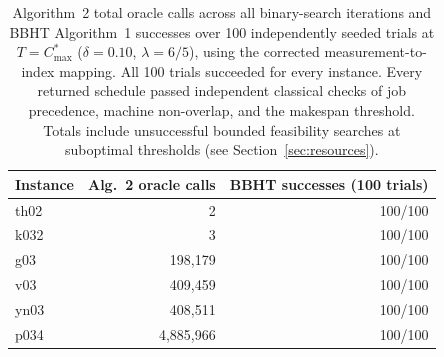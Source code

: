 \begin{table}[!ht]
\centering\small
\begin{tabular}{lrr}
\toprule
Instance & Alg.~2 oracle calls & BBHT successes (100 trials) \\
\midrule
th02 & 2 & 100/100 \\
k032 & 3 & 100/100 \\
g03  & 198{,}179 & 100/100 \\
v03  & 409{,}459 & 100/100 \\
yn03 & 408{,}511 & 100/100 \\
p034 & 4{,}885{,}966 & 100/100 \\
\bottomrule
\end{tabular}
\caption{Algorithm~2 total oracle calls across all binary-search
iterations and BBHT Algorithm~1 successes over 100 independently seeded
trials at $T=C^*_{\max}$ ($\delta=0.10$, $\lambda=6/5$),
using the corrected measurement-to-index mapping.
All 100 trials succeeded for every instance.
Every returned schedule passed independent classical checks of
job precedence, machine non-overlap, and the makespan threshold.
Totals include unsuccessful bounded feasibility searches at suboptimal
thresholds (see Section~\ref{sec:resources}).}
\label{tab:alg-results}
\end{table}
